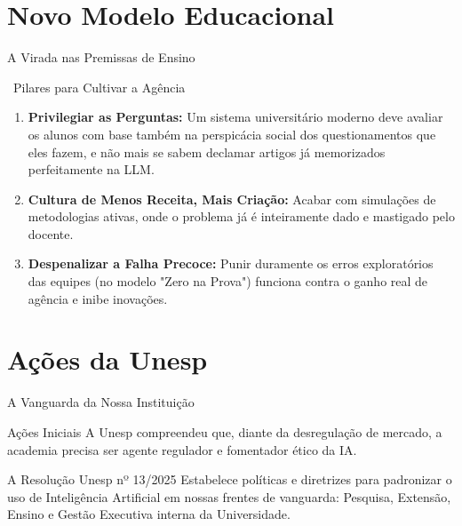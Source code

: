 \documentclass[aspectratio=169,12pt]{beamer}
\begin{document}

\section{Novo Modelo Educacional}

\begin{frame}{A Virada nas Premissas de Ensino}
    \begin{block}{\faSync\, Pilares para Cultivar a Agência}
        \begin{enumerate}
            \item \textbf{Privilegiar as Perguntas:} Um sistema universitário moderno deve avaliar os alunos com base também na perspicácia social dos questionamentos que eles fazem, e não mais se sabem declamar artigos já memorizados perfeitamente na LLM.
            \item \textbf{Cultura de Menos Receita, Mais Criação:} Acabar com simulações de metodologias ativas, onde o problema já é inteiramente dado e mastigado pelo docente.
            \item \textbf{Despenalizar a Falha Precoce:} Punir duramente os erros exploratórios das equipes (no modelo "Zero na Prova") funciona contra o ganho real de agência e inibe inovações. 
        \end{enumerate}
    \end{block}
\end{frame}


\section{Ações da Unesp}

\begin{frame}{A Vanguarda da Nossa Instituição}
    \begin{exampleblock}{Ações Iniciais}
        A Unesp compreendeu que, diante da desregulação de mercado, a academia precisa ser agente regulador e fomentador ético da IA.
    \end{exampleblock}
    
    \begin{block}{A Resolução Unesp nº 13/2025}
        Estabelece políticas e diretrizes para padronizar o uso de Inteligência Artificial em nossas frentes de vanguarda: Pesquisa, Extensão, Ensino e Gestão Executiva interna da Universidade.
    \end{block}
\end{frame}
\end{document}
